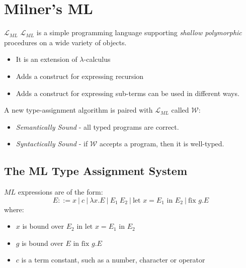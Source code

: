 
\newcommand{\mllet}[2]{\text{let } #1 \text{ in } #2}
\newcommand{\mlfix}[2]{\text{fix } #1 . #2}

\chapter{Milner's ML}
\begin{definitionbox}{$\mathcal{L}_{ML}$}
    $\mathcal{L}_{ML}$ is a simple programming language supporting \textit{shallow polymorphic} procedures on a wide variety of objects.
    \begin{itemize}
        \item It is an extension of $\lambda$-calculus
        \item Adds a construct for expressing recursion
        \item Adds a construct for expressing sub-terms can be used in different ways.
    \end{itemize}
\end{definitionbox}

A new type-assignment algorithm is paired with $\mathcal{L}_{ML}$ called $\mathcal{W}$:
\begin{itemize}
    \item \textit{Semantically Sound} - all typed programs are correct.
    \item \textit{Syntactically Sound} - if $\mathcal{W}$ accepts a program, then it is well-typed.
\end{itemize}

\section{The ML Type Assignment System}
$ML$ expressions are of the form:
\[E ::= x \ | \ c \ | \ \lambda x.E \ | \ E_1 \ E_2 \ | \ \mllet{x = E_1}{E_2} \ | \ \text{fix }g . E\]
where:
\begin{itemize}
    \item $x$ is bound over $E_2$ in $\text{let }x = E_1 \text{ in } E_2$
    \item $g$ is bound over $E$ in $\text{fix }g . E$
    \item $c$ is a term constant, such as a number, character or operator
\end{itemize}
